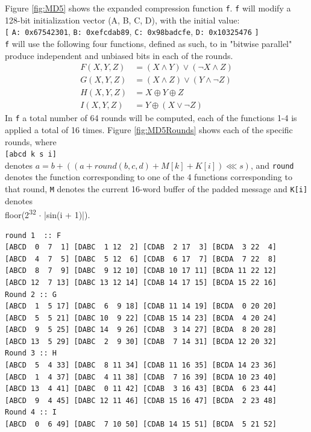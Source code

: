 \documentclass[a4paper, openany]{book}
\begin{document}
\begin{abstact}
Figure \ref{fig:MD5} shows the expanded compression function \texttt{f}. \texttt{f} will modify a 128-bit initialization vector (A, B, C, D), with the initial value:\\
\texttt{[} \texttt{A: 0x67542301}, \texttt{B: 0xefcdab89}, \texttt{C: 0x98badcfe}, \texttt{D: 0x10325476} \texttt{]}\\
\texttt{f} will use the following four functions, defined as such, to in "bitwise parallel" produce independent and unbiased bits in each of the rounds.
\begin{align}
F(X, Y, Z) &= (X \wedge Y) \vee (\neg X \wedge Z) \\
G(X, Y, Z) &= (X \wedge Z) \vee (Y \wedge \neg Z) \\
H(X, Y, Z) &= X \oplus Y \oplus Z \\
I(X, Y, Z) &= Y \oplus ( X \vee \neg Z)
\end{align}
In \texttt{f} a total number of 64 rounds will be computed, each of the functions 1-4 is applied a total of 16 times. Figure \ref{fig:MD5Rounds} shows each of the specific rounds, where\\
\texttt{[abcd k s i]}\\
denotes \(a = b + (( a + round(b,c,d) + M[k] + K[i]) \lll s)\), and \texttt{round} denotes the function corresponding to one of the 4 functions corresponding to that round, \texttt{M} denotes the current 16-word buffer of the padded message and \texttt{K[i]} denotes\\
floor(2\textsuperscript{32} \(\cdot\) |sin(i + 1)|).
\begin{table}[H]
\centering
\begin{BVerbatim}[fontsize=\tiny]
round 1  :: F
[ABCD  0  7  1] [DABC  1 12  2] [CDAB  2 17  3] [BCDA  3 22  4]
[ABCD  4  7  5] [DABC  5 12  6] [CDAB  6 17  7] [BCDA  7 22  8]
[ABCD  8  7  9] [DABC  9 12 10] [CDAB 10 17 11] [BCDA 11 22 12]
[ABCD 12  7 13] [DABC 13 12 14] [CDAB 14 17 15] [BCDA 15 22 16]
Round 2 :: G
[ABCD  1  5 17] [DABC  6  9 18] [CDAB 11 14 19] [BCDA  0 20 20]
[ABCD  5  5 21] [DABC 10  9 22] [CDAB 15 14 23] [BCDA  4 20 24]
[ABCD  9  5 25] [DABC 14  9 26] [CDAB  3 14 27] [BCDA  8 20 28]
[ABCD 13  5 29] [DABC  2  9 30] [CDAB  7 14 31] [BCDA 12 20 32]
Round 3 :: H
[ABCD  5  4 33] [DABC  8 11 34] [CDAB 11 16 35] [BCDA 14 23 36]
[ABCD  1  4 37] [DABC  4 11 38] [CDAB  7 16 39] [BCDA 10 23 40]
[ABCD 13  4 41] [DABC  0 11 42] [CDAB  3 16 43] [BCDA  6 23 44]
[ABCD  9  4 45] [DABC 12 11 46] [CDAB 15 16 47] [BCDA  2 23 48]
Round 4 :: I
[ABCD  0  6 49] [DABC  7 10 50] [CDAB 14 15 51] [BCDA  5 21 52]

\end{BVerbatim}
\end{table}
\end{abstact}
\end{document}
